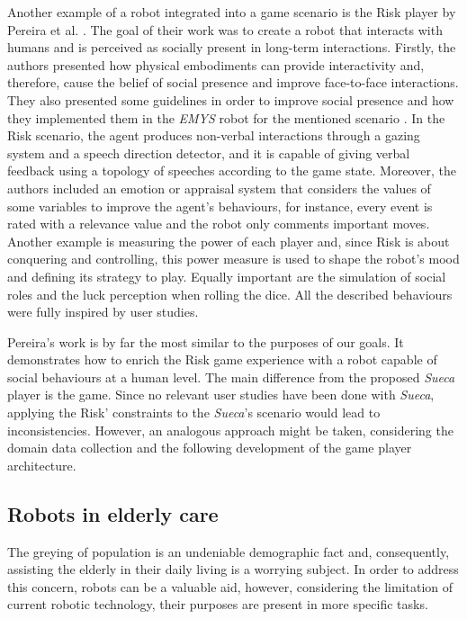 Another example of a robot integrated into a game scenario is the Risk player by Pereira et al. \cite{Lisboa}.
The goal of their work was to create a robot that interacts with humans and is perceived as socially present in long-term interactions.
Firstly, the authors presented how physical embodiments can provide interactivity and, therefore, cause the belief of social presence and improve face-to-face interactions.
They also presented some guidelines in order to improve social presence and how they implemented them in the \emph{EMYS} robot for the mentioned scenario \cite{Pereira}.
In the Risk scenario, the agent produces non-verbal interactions through a gazing system and a speech direction detector, and it is capable of giving verbal feedback using a topology of speeches according to the game state.
Moreover, the authors included an emotion or appraisal system that considers the values of some variables to improve the agent's behaviours, for instance, every event is rated with a relevance value and the robot only comments important moves.
Another example is measuring the power of each player and, since Risk is about conquering and controlling, this power measure is used to shape the robot's mood and defining its strategy to play.
Equally important are the simulation of social roles and the luck perception when rolling the dice.
All the described behaviours were fully inspired by user studies.

Pereira's work is by far the most similar to the purposes of our goals.
It demonstrates how to enrich the Risk game experience with a robot capable of social behaviours at a human level.
The main difference from the proposed \emph{Sueca} player is the game.
Since no relevant user studies have been done with \emph{Sueca}, applying the Risk' constraints to the \emph{Sueca}'s scenario would lead to inconsistencies.
However, an analogous approach might be taken, considering the domain data collection and the following development of the game player architecture.


\subsection{Robots in elderly care}

The greying of population is an undeniable demographic fact and, consequently, assisting the elderly in their daily living is a worrying subject.
In order to address this concern, robots can be a valuable aid, however, considering the limitation of current robotic technology, their purposes are present in more specific tasks.


